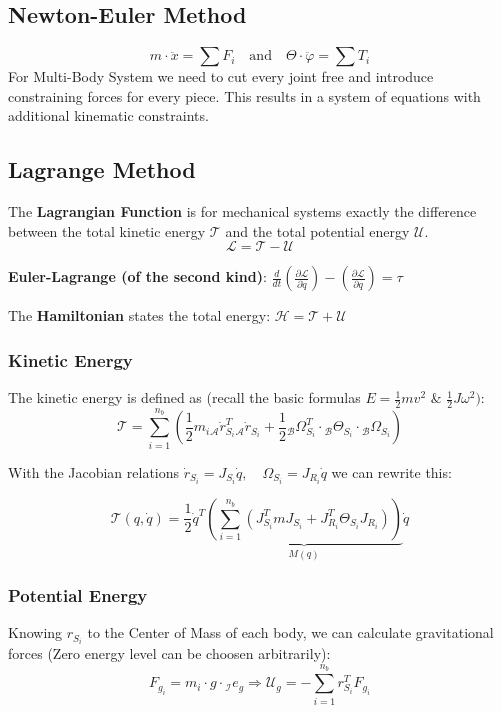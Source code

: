 \documentclass[fontsize=6pt,DIV=calc,a4paper,ngerman]{scrartcl}
\begin{document}
\begin{multicols*}{4}
\begin{center}
	\end{center}

	\subsection{Newton-Euler Method}

	$$m\cdot \ddot{x} = \sum F_i \quad \text{and} \quad \Theta \cdot \ddot{\varphi} = \sum T_i$$
	For Multi-Body System we need to cut every joint free and introduce constraining forces for every piece. This results in a system of equations with additional kinematic constraints.

	\subsection{Lagrange Method}

	The \textbf{Lagrangian Function} is for mechanical systems exactly the difference between the total kinetic energy $\mathcal{T}$ and the total potential energy $\mathcal{U}$.
	$$\mathcal{L} = \mathcal{T}-\mathcal{U}$$

	\textbf{Euler-Lagrange (of the second kind)}:
	$\frac{d}{dt}\left(\frac{\partial \mathcal{L}}{\partial \dot{q}}\right) - \left(\frac{\partial \mathcal{L}}{\partial q}\right) = \tau$

	The \textbf{Hamiltonian} states the total energy: $\mathcal{H}= \mathcal{T}+\mathcal{U}$

	\subsubsection{Kinetic Energy}

	The kinetic energy is defined as (recall the basic formulas $E = \frac{1}{2}mv^2$ \& $\frac{1}{2}J\omega^2)$:
	$$\mathcal{T} = \sum_{i=1}^{n_b}\left( \frac{1}{2} m_i{}_\mathcal{A}\dot{r}^{T}_{S_i}{}_\mathcal{A}\dot{r}_{S_i}+\frac{1}{2}{}_\mathcal{B}\Omega_{S_i}^T \cdot {}_\mathcal{B}\Theta_{S_i}\cdot {}_\mathcal{B}\Omega_{S_i}\right)$$

	With the Jacobian relations $\dot{r}_{S_i} = J_{S_i}\dot{q}, \quad \Omega_{S_i} = J_{R_i}\dot{q} $ we can rewrite this:

	$$\mathcal{T}(q,\dot{q}) = \frac{1}{2} \dot{q}^T \underbrace{ \left( \sum_{i=1}^{n_b} (J_{S_i}^T mJ_{S_i} + J_{R_i}^T \Theta_{S_i}J_{R_i})\right)}_{M(q)}\dot{q}$$

	\subsubsection{Potential Energy}
	Knowing $r_{S_i}$ to the Center of Mass of each body, we can calculate gravitational forces (Zero energy level can be choosen arbitrarily):
	$$F_{g_i}= m_i\cdot g\cdot {}_\mathcal{I}e_g \Rightarrow \mathcal{U}_g= -\sum_{i=1}^{n_b} r_{S_i}^TF_{g_i}$$


\end{multicols*}
\end{document}
